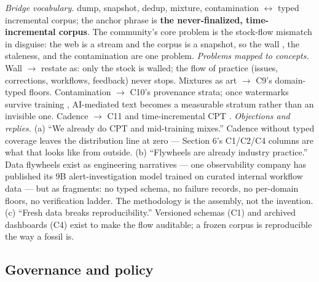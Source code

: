 \documentclass[10pt]{article}
\begin{document}
\emph{Bridge vocabulary.} dump, snapshot, dedup, mixture, contamination $\leftrightarrow$ typed incremental corpus; the anchor phrase is \textbf{the never-finalized, time-incremental corpus}. The community's core problem is the stock-flow mismatch in disguise: the web is a stream and the corpus is a snapshot, so the wall \cite{ref1}, the staleness, and the contamination are one problem. \emph{Problems mapped to concepts.} Wall $\to$ restate as: only the stock is walled; the flow of practice (issues, corrections, workflows, feedback) never stops. Mixtures as art $\to$ C9's domain-typed floors. Contamination $\to$ C10's provenance strata; once watermarks survive training \cite{ref44}, AI-mediated text becomes a measurable stratum rather than an invisible one. Cadence $\to$ C11 and time-incremental CPT \cite{ref47}. \emph{Objections and replies.} (a) ``We already do CPT and mid-training mixes.'' Cadence without typed coverage leaves the distribution line at zero --- Section 6's C1/C2/C4 columns are what that looks like from outside. (b) ``Flywheels are already industry practice.'' Data flywheels exist as engineering narratives --- one observability company has published its 9B alert-investigation model trained on curated internal workflow data \cite{ref8} --- but as fragments: no typed schema, no failure records, no per-domain floors, no verification ladder. The methodology is the assembly, not the invention. (c) ``Fresh data breaks reproducibility.'' Versioned schemas (C1) and archived dashboards (C4) exist to make the flow auditable; a frozen corpus is reproducible the way a fossil is.

\subsection{Governance and policy}
\end{document}
